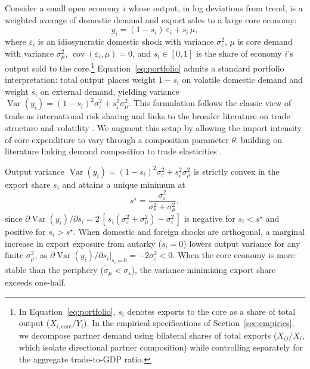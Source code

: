 \documentclass[12pt, a4paper]{article}
\begin{document}
Consider a small open economy $i$ whose output, in log deviations from trend, is a weighted average of domestic demand and export sales to a large core economy:
\begin{equation}
y_i = (1-s_i)\,\varepsilon_i + s_i\,\mu ,
\label{eq:portfolio}
\end{equation}
where $\varepsilon_i$ is an idiosyncratic domestic shock with variance $\sigma_\varepsilon^2$, $\mu$ is core demand with variance $\sigma_\mu^2$, $\operatorname{cov}(\varepsilon_i,\mu)=0$, and $s_i\in[0,1]$ is the share of economy $i$'s output sold to the core.\footnote{In Equation~\eqref{eq:portfolio}, $s_i$ denotes exports to the core as a share of total output ($X_{i,\text{core}}/Y_i$). In the empirical specifications of Section~\ref{sec:empirics}, we decompose partner demand using bilateral shares of total exports ($X_{ij}/X_i$, which isolate directional partner composition) while controlling separately for the aggregate trade-to-GDP ratio.} Equation~\eqref{eq:portfolio} admits a standard portfolio interpretation: total output places weight $1-s_i$ on volatile domestic demand and weight $s_i$ on external demand, yielding variance $\operatorname{Var}(y_i)=(1-s_i)^2\sigma_\varepsilon^2 + s_i^2\sigma_\mu^2$. This formulation follows the classic view of trade as international risk sharing \citep{obstfeld1994, kalemliozcan2003} and links to the broader literature on trade structure and volatility \citep{rodrik1998, digiovanni2009}. We augment this setup by allowing the import intensity of core expenditure to vary through a composition parameter $\theta$, building on literature linking demand composition to trade elasticities \citep{bussiere2013}.

Output variance $\operatorname{Var}(y_i)=(1-s_i)^2\sigma_\varepsilon^2+s_i^2\sigma_\mu^2$ is strictly convex in the export share $s_i$ and attains a unique minimum at
\begin{equation}
s^\star=\frac{\sigma_\varepsilon^2}{\sigma_\varepsilon^2+\sigma_\mu^2},
\end{equation}
since $\partial \operatorname{Var}(y_i)/\partial s_i = 2\,[\,s_i(\sigma_\varepsilon^2+\sigma_\mu^2)-\sigma_\varepsilon^2\,]$ is negative for $s_i < s^\star$ and positive for $s_i > s^\star$. When domestic and foreign shocks are orthogonal, a marginal increase in export exposure from autarky ($s_i=0$) lowers output variance for any finite $\sigma_\mu^2$, as $\partial \operatorname{Var}(y_i)/\partial s_i|_{s_i=0} = -2\sigma_\varepsilon^2 < 0$. When the core economy is more stable than the periphery ($\sigma_\mu < \sigma_\varepsilon$), the variance-minimizing export share exceeds one-half.
\end{document}
